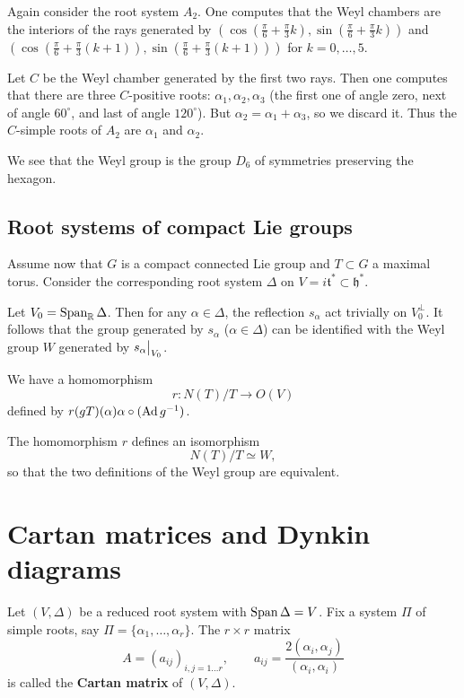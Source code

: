 \documentclass[11pt, english]{article}
\begin{document}
\begin{example}
 Again consider the root system $A_2$. One computes that the Weyl chambers are the interiors of the rays generated by $\left(\cos( \frac{\pi}{6}+\frac{\pi}{3}k), \sin( \frac{\pi}{6} + \frac{\pi}3 k)\right)$ and $\left(\cos( \frac{\pi}{6}+\frac{\pi}{3}(k+1)), \sin( \frac{\pi}{6} + \frac{\pi}3 (k+1))\right)$ for $k=0,\ldots,5$.

Let $C$ be the Weyl chamber generated by the first two rays. Then one computes that there are three $C$-positive roots: $\alpha_1,\alpha_2,\alpha_3$ (the first one of angle zero, next of angle $60^\circ$, and last of angle $120^\circ$). But $\alpha_2=\alpha_1+\alpha_3$, so we discard it. Thus the $C$-simple roots of $A_2$ are $\alpha_1$ and $\alpha_2$.

We see that the Weyl group is the group $D_6$ of symmetries preserving the hexagon.
\end{example}

\subsection{Root systems of compact Lie groups}

Assume now that $G$ is a compact connected Lie group and $T \subset G$ a maximal torus. Consider the corresponding root system $\Delta$ on $V=i \mathfrak t ^\ast \subset \mathfrak h^\ast$. 

Let $V_0 = \operatorname{Span}_{\mathbb{R}} \Delta$. Then for any $\alpha \in \Delta$, the reflection $s_\alpha$ act trivially on $V_0^\perp$. It follows that the group generated by $s_\alpha$ ($\alpha \in \Delta$) can be identified with the Weyl group $W$ generated by $\restr{s_\alpha}{V_0}$.

We have a homomorphism
$$
r \colon N(T) / T \to O(V)
$$
defined by $r(gT)(\alpha) \alpha \circ (\operatorname{Ad} g^{-1})$.

\begin{thm}
 The homomorphism $r$ defines an isomorphism 
$$
N(T) / T \simeq W,
$$
so that the two definitions of the Weyl group are equivalent.
\end{thm}


\newpage
\section{Cartan matrices and Dynkin diagrams}

Let $(V,\Delta)$ be a reduced root system with $\operatorname{Span} \Delta = V$. Fix a system $\Pi$ of simple roots, say $\Pi = \{ \alpha_1, \ldots, \alpha_r \}$. The $r \times r$ matrix 
$$
A = {(a_{ij})}_{i,j=1\ldots r}, \qquad a_{ij} = \frac{2(\alpha_i,\alpha_j)}{(\alpha_i,\alpha_i)}
$$
is called the \textbf{Cartan matrix} of $(V,\Delta)$.
\end{document}
